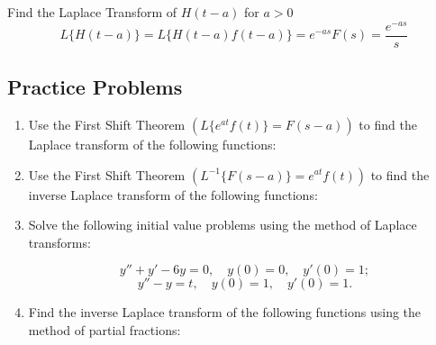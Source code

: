 \documentclass[a4paper, 10pt]{article}
\begin{document}
\begin{examplebox}{Find the Laplace Transform of $H(t-a)$ for $a > 0$}{}
  $$L\{H(t-a)\} = L\{H(t-a)f(t-a)\} = e^{-as}F(s) = \dfrac{e^{-as}}{s}$$
\end{examplebox}


\subsection{Practice Problems}
\begin{enumerate}
  \item Use the First Shift Theorem \(\left( L \{ e^{at} f(t) \} = F(s - a) \right)\) to find the Laplace transform of the following functions:

  \item Use the First Shift Theorem \(\left( L^{-1} \{ F(s - a) \} = e^{at} f(t) \right)\) to find the inverse Laplace transform of the following functions:

  \item Solve the following initial value problems using the method of Laplace transforms:

        $$
          y'' + y' - 6y = 0 , \quad  y(0) = 0 , \quad  y'(0) = 1 ;
        $$
        $$
          y'' - y = t , \quad  y(0) = 1 , \quad  y'(0) = 1 .
        $$
  \item Find the inverse Laplace transform of the following functions using the method of partial fractions:

\end{enumerate}
\end{document}
